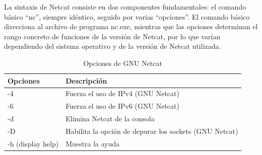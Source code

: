 \begin{itemize}
\begin{itemize}
        La sintaxis de Netcat consiste en dos componentes fundamentales: el comando básico “nc”, siempre idéntico, seguido por varias “opciones”. El comando básico direcciona al archivo de programa nc.exe, mientras que las opciones determinan el rango concreto de funciones de la versión de Netcat, por lo que varían dependiendo del sistema operativo y de la versión de Netcat utilizada.

        \begin{table}[h!]
            \centering
            \begin{tabular}{|l|l|}
            \hline
            \textbf{Opciones} & \textbf{Descripción} \\ \hline
            -4 & Fuerza el uso de IPv4 (GNU Netcat) \\ \hline
            -6 & Fuerza el uso de IPv6 (GNU Netcat) \\ \hline
            -d & Elimina Netcat de la consola  \\ \hline
            -D & Habilita la opción de depurar los sockets (GNU Netcat) \\ \hline
            -h (display help) & Muestra la ayuda  \\ \hline
            \end{tabular}
            \caption{Opciones de GNU Netcat}
            \label{tab:netcat_options}
            \end{table}            
    \end{itemize}
\end{itemize}   
